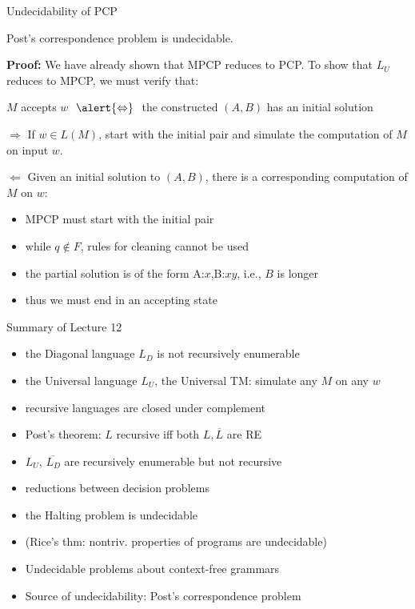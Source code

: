 \documentclass[handout]{beamer}
\begin{document}
    
\begin{frame}{Undecidability of PCP}
    
    \begin{theorem}
        Post's correspondence problem is undecidable.
    \end{theorem}    
    \textbf{Proof:} We have already shown that MPCP reduces to PCP. To show that $L_U$ reduces to MPCP, we must verify that:
    
    $M$ accepts $w$ $\ \alert{\Leftrightarrow}\ $ the constructed $(A,B)$ has an initial solution

    \alert{$\Rightarrow$} If $w\in L(M)$, start with the initial pair and simulate the computation of $M$ on input $w$.  

    \alert{$\Leftarrow $} Given an initial solution to $(A,B)$, there is a corresponding computation of $M$ on $w$:
    \vspace{-3pt}
    \begin{itemize}
        \item MPCP must start with the initial pair
        \item while $q\notin F$, rules for cleaning cannot be used
        \item the partial solution is of the form A:$x$,B:$xy$, i.e., $B$ is longer
        \item thus we must end in an accepting state\hfill\qedsymbol
    \end{itemize}

\end{frame}


\begin{frame}{Summary of Lecture 12}

    \begin{itemize}
        \item the Diagonal language $L_D$ is not recursively enumerable
        \item the Universal language $L_U$, the Universal TM: simulate any $M$ on any $w$
        \item recursive languages are closed under complement
        \item Post's theorem: $L$ recursive iff both $L,\overline{L}$ are RE
        \item $L_U$, $\overline{L_D}$ are recursively enumerable but not recursive
        \item reductions between decision problems
        \item the Halting problem is undecidable        
        \item (Rice's thm: nontriv. properties of programs are undecidable)
        \item Undecidable problems about context-free grammars
        \item Source of undecidability: Post's correspondence problem
    \end{itemize}

\end{frame}
\end{document}
